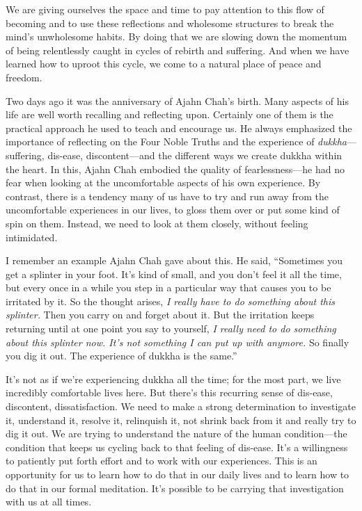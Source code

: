 We are giving ourselves the space and time to pay attention to this 
flow of becoming and to use these reflections and wholesome structures 
to break the mind's unwholesome habits. By doing that we are slowing 
down the momentum of being relentlessly caught in cycles of rebirth and 
suffering. And when we have learned how to uproot this cycle, we come 
to a natural place of peace and freedom.


Two days ago it was the anniversary of Ajahn Chah's birth. Many aspects 
of his life are well worth recalling and reflecting upon. Certainly one 
of them is the practical approach he used to teach and encourage us. He 
always emphasized the importance of reflecting on the Four Noble Truths 
and the experience of \emph{dukkha}---suffering, dis-ease, 
discontent---and the different ways we create dukkha within the heart. 
In this, Ajahn Chah embodied the quality of fearlessness---he had no 
fear when looking at the uncomfortable aspects of his own experience. 
By contrast, there is a tendency many of us have to try and run away 
from the uncomfortable experiences in our lives, to gloss them over or 
put some kind of spin on them. Instead, we need to look at them 
closely, without feeling intimidated.

I remember an example Ajahn Chah gave about this. He said, ``Sometimes 
you get a splinter in your foot. It's kind of small, and you don't feel 
it all the time, but every once in a while you step in a particular way 
that causes you to be irritated by it. So the thought arises, \emph{I 
really have to do something about this splinter.} Then you carry on and 
forget about it. But the irritation keeps returning until at one point 
you say to yourself, \emph{I really need to do something about this 
splinter now. It's not something I can put up with anymore.} So finally 
you dig it out. The experience of dukkha is the same.''

It's not as if we're experiencing dukkha all the time; for the most 
part, we live incredibly comfortable lives here. But there's this 
recurring sense of dis-ease, discontent, dissatisfaction. We need to 
make a strong determination to investigate it, understand it, resolve 
it, relinquish it, not shrink back from it and really try to dig it 
out. We are trying to understand the nature of the human 
condition---the condition that keeps us cycling back to that feeling of 
dis-ease. It's a willingness to patiently put forth effort and to work 
with our experiences. This is an opportunity for us to learn how to do 
that in our daily lives and to learn how to do that in our formal 
meditation. It's possible to be carrying that investigation with us at 
all times.

